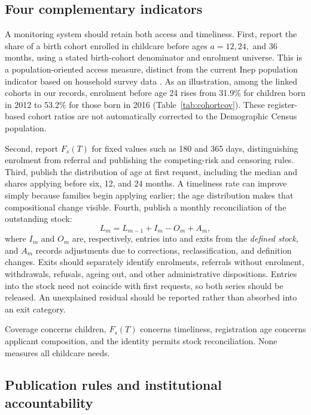 \subsection{Four complementary indicators}

A monitoring system should retain both access and timeliness. First, report the share of a birth cohort enrolled in childcare before ages $a=12,24,$ and $36$ months, using a stated birth-cohort denominator and enrolment universe. This is a population-oriented access measure, distinct from the current Inep population indicator based on household survey data \citep{inep2024quintociclo}. As an illustration, among the linked cohorts in our records, enrolment before age 24 rises from 31.9\% for children born in 2012 to 53.2\% for those born in 2016 (Table~\ref{tab:cohortcov}). These register-based cohort ratios are not automatically corrected to the Demographic Census population.

Second, report $F_s(T)$ for fixed values such as 180 and 365 days, distinguishing enrolment from referral and publishing the competing-risk and censoring rules. Third, publish the distribution of age at first request, including the median and shares applying before six, 12, and 24 months. A timeliness rate can improve simply because families begin applying earlier; the age distribution makes that compositional change visible. Fourth, publish a monthly reconciliation of the outstanding stock:
\begin{equation}
L_m=L_{m-1}+I_m-O_m+A_m,
\label{eq:stock_identity}
\end{equation}
where $I_m$ and $O_m$ are, respectively, entries into and exits from the \emph{defined stock}, and $A_m$ records adjustments due to corrections, reclassification, and definition changes. Exits should separately identify enrolments, referrals without enrolment, withdrawals, refusals, ageing out, and other administrative dispositions. Entries into the stock need not coincide with first requests, so both series should be released. An unexplained residual should be reported rather than absorbed into an exit category.

Coverage concerns children, $F_s(T)$ concerns timeliness, registration age concerns applicant composition, and the identity permits stock reconciliation. None measures all childcare needs.

\subsection{Publication rules and institutional accountability}\label{sec:policy}

